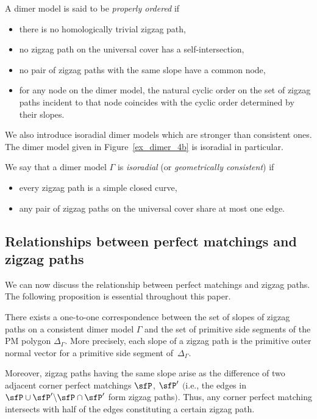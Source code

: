 \begin{Definition}\label{def_properly}
A dimer model is said to be \emph{properly ordered} if
\begin{itemize}\itemsep=0pt
\item [(1)] there is no homologically trivial zigzag path,
\item [(2)] no zigzag path on the universal cover has a self-intersection,
\item [(3)] no pair of zigzag paths with the same slope have a common node,
\item [(4)] for any node on the dimer model, the natural cyclic order on the set of zigzag paths incident to that node
coincides with the cyclic order determined by their slopes.
\end{itemize}
\end{Definition}

We also introduce isoradial dimer models which are stronger than consistent ones.
The dimer model given in Figure~\ref{ex_dimer_4b} is isoradial in particular.

\begin{Definition}
\label{def_isoradial}
We say that a dimer model $\Gamma$ is \emph{isoradial} (or \emph{geometrically consistent}) if
\begin{itemize}\itemsep=0pt
\item [(1)] every zigzag path is a simple closed curve,
\item [(2)] any pair of zigzag paths on the universal cover share at most one edge.
\end{itemize}
\end{Definition}

\subsection{Relationships between perfect matchings and zigzag paths}\label{subsec_relation_zigzag_pm}

We can now discuss the relationship between perfect matchings and zigzag paths.
The following proposition is essential throughout this paper.

\begin{Proposition}\label{zigzag_sidepolygon}
There exists a one-to-one correspondence between the set of slopes of zigzag paths on a consistent dimer model $\Gamma$ and
the set of primitive side segments of the PM polygon $\Delta_\Gamma$. More precisely, each slope of a zigzag path is the primitive outer normal vector for a primitive side segment of~$\Delta_\Gamma$.

Moreover, zigzag paths having the same slope arise as the difference of two adjacent corner perfect matchings $\sfP$, $\sfP^\prime$ $($i.e., the edges in $\sfP\cup\sfP^\prime{\setminus}\sfP\cap\sfP^\prime$ form zigzag paths$)$. Thus, any corner perfect matching intersects with half of the edges constituting a certain zigzag path.
\end{Proposition}

